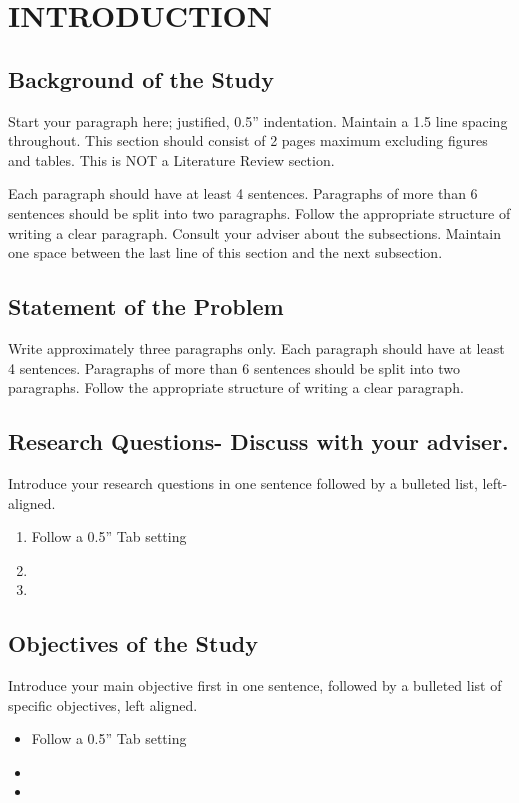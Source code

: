 \setlength{\parindent}{0.5in} 
\setlength{\parskip}{0mm}
\setlength{\baselineskip}{1.6em}

\chapter{INTRODUCTION} 

\section{Background of the Study}
Start your paragraph here; justified, 0.5” indentation. Maintain a 1.5 line spacing throughout. This section should consist of 2 pages maximum excluding figures and tables. This is NOT a Literature Review section.

Each paragraph should have at least 4 sentences. Paragraphs of more than 6 sentences should be split into two paragraphs. Follow the appropriate structure of writing a clear paragraph.  Consult your adviser about the subsections. Maintain one space between the last line of this section and the next subsection.

\section{Statement of the Problem}
Write approximately three paragraphs only. Each paragraph should have at least 4 sentences. Paragraphs of more than 6 sentences should be split into two paragraphs. Follow the appropriate structure of writing a clear paragraph.

\section{Research Questions- Discuss with your adviser.}
Introduce your research questions in one sentence followed by a bulleted list, left-aligned.

\begin{enumerate}
    \item Follow a 0.5” Tab setting
    \item
    \item
\end{enumerate}

\section{Objectives of the Study}
Introduce your main objective first in one sentence, followed by a bulleted list of specific objectives, left aligned.
\begin{itemize}
    \item Follow a 0.5” Tab setting
    \item
    \item
\end{itemize}

